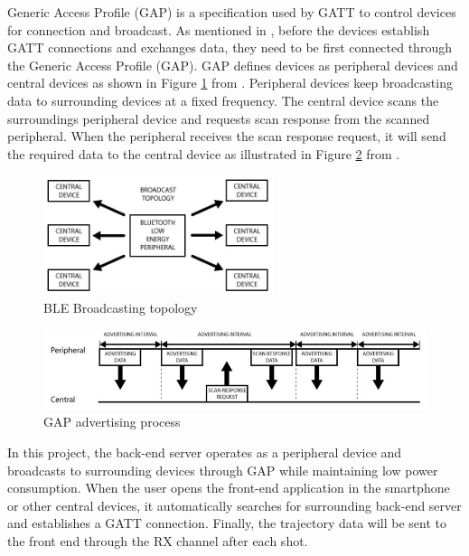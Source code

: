Generic Access Profile (GAP) is a specification used by GATT to control devices for connection and broadcast. As mentioned in \textcite{ble}, before the devices establish GATT connections and exchanges data, they need to be first connected through the Generic Access Profile (GAP). GAP defines devices as peripheral devices and central devices as shown in Figure \ref{fig:broadcast} from \textcite{ble}. Peripheral devices keep broadcasting data to surrounding devices at a fixed frequency. The central device scans the surroundings peripheral device and requests scan response from the scanned peripheral. When the peripheral receives the scan response request, it will send the required data to the central device as illustrated in Figure \ref{fig:advertise} from \textcite{ble}.
\begin{figure}[H]
    \centering
    \includegraphics[width=0.6\textwidth]{figure/broadcast.jpg}
    \caption{BLE Broadcasting topology}
    \label{fig:broadcast}
\end{figure}
\begin{figure}[H]
    \centering
    \includegraphics[width=\textwidth]{figure/advertise.jpg}
    \caption{GAP advertising process}
    \label{fig:advertise}
\end{figure}


In this project, the back-end server operates as a peripheral device and broadcasts to surrounding devices through GAP while maintaining low power consumption. When the user opens the front-end application in the smartphone or other central devices, it automatically searches for surrounding back-end server and establishes a GATT connection. Finally, the trajectory data will be sent to the front end through the RX channel after each 
shot.

